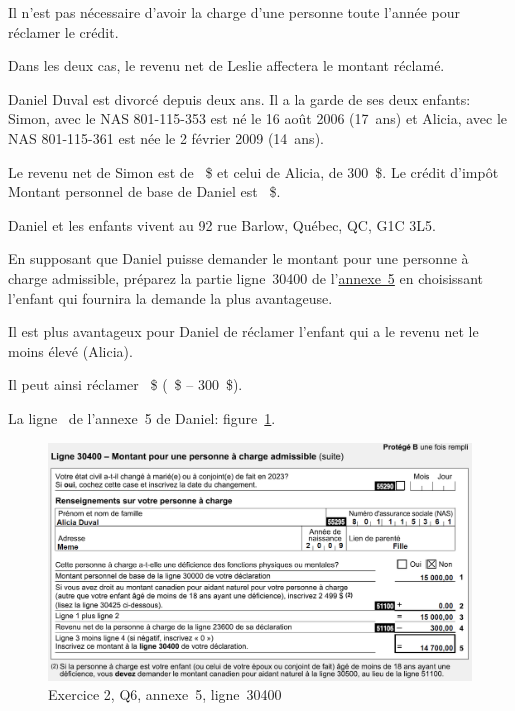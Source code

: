 Il n'est pas nécessaire d'avoir la charge d'une personne toute l'année pour réclamer le crédit.

Dans les deux cas, le revenu net de Leslie affectera le montant réclamé.

\begin{question}
	Daniel Duval est divorcé depuis deux ans. Il a la garde de ses deux enfants: Simon, avec le NAS 801-115-353 est né le 16 août 2006 (17~ans) et Alicia, avec le NAS 801-115-361 est née le 2 février 2009 (14~ans).
	
	Le revenu net de Simon est de ~\$ et celui de Alicia, de 300~\$. Le crédit d'impôt \og Montant personnel de base \fg{} de Daniel est ~\$.
	
	Daniel et les enfants vivent au 92 rue Barlow, Québec, QC, G1C 3L5.
	
	En supposant que Daniel puisse demander le montant pour une personne à charge admissible, préparez la partie ligne~30400 de l'\href{https://www.canada.ca/fr/agence-revenu/services/formulaires-publications/trousses-impot-toutes-annees-imposition/trousse-generale-impot-prestations/5000-s5.html}{annexe~5} en choisissant l'enfant qui fournira la demande la plus avantageuse.
\end{question}
Il est plus avantageux pour Daniel de réclamer l'enfant qui a le revenu net le moins élevé (Alicia).

Il peut ainsi réclamer ~\$ (~\$ – 300~\$).

La ligne~ \fg{} de l'annexe~5 de Daniel: figure~\ref{fig:chap4Exercice2Q6}.
\begin{figure}
	\centering
	\includegraphics[width=.9\textwidth]{exercice/4-2/Q6/30400.png}
	\caption{Exercice 2, Q6, annexe~5, ligne~30400}
	\label{fig:chap4Exercice2Q6}
\end{figure}

